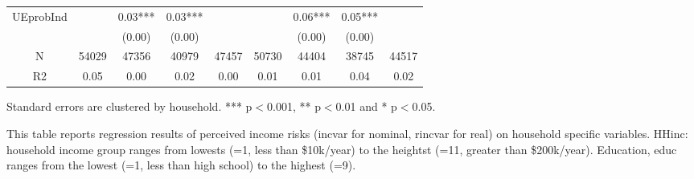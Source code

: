 \begin{table}[ht]
\begin{adjustbox}{width={0.9\textwidth},totalheight={\textheight}}
\begin{threeparttable}
\begin{tabular}{ccccccccc}
UEprobInd    &          &   0.03*** &    0.03*** &             &           &    0.06*** &     0.05*** &              \\
             &          &    (0.00) &     (0.00) &             &           &     (0.00) &      (0.00) &              \\
N            &    54029 &     47356 &      40979 &       47457 &     50730 &      44404 &       38745 &        44517 \\
R2           &     0.05 &      0.00 &       0.02 &        0.00 &      0.01 &       0.01 &        0.04 &         0.02 \\
\bottomrule
\end{tabular}
\begin{tablenotes}\item Standard errors are clustered by household. *** p$<$0.001, ** p$<$0.01 and * p$<$0.05. 
\item This table reports regression results of perceived income risks (incvar for nominal, rincvar for real) on household specific variables. HHinc: household income group ranges from lowests (=1, less than \$10k/year) to the heightst (=11, greater than \$200k/year). Education, educ ranges from the lowest (=1, less than high school) to the highest (=9).
\end{tablenotes}
\end{threeparttable}
\end{adjustbox}
\end{table}